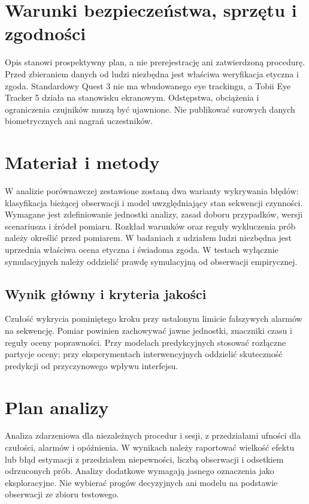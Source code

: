 \documentclass[11pt,a4paper]{article}
\begin{document}
\section{Warunki bezpieczeństwa, sprzętu i zgodności}
Opis stanowi prospektywny plan, a nie prerejestrację ani zatwierdzoną procedurę. Przed zbieraniem danych od ludzi niezbędna jest właściwa weryfikacja etyczna i zgoda. Standardowy Quest 3 nie ma wbudowanego eye trackingu, a Tobii Eye Tracker 5 działa na stanowisku ekranowym. Odstępstwa, obciążenia i ograniczenia czujników muszą być ujawnione. Nie publikować surowych danych biometrycznych ani nagrań uczestników.

\section{Materiał i metody}

W analizie porównawczej zestawione zostaną dwa warianty wykrywania błędów: klasyfikacja bieżącej obserwacji i model uwzględniający stan sekwencji czynności. Wymagane jest zdefiniowanie jednostki analizy, zasad doboru przypadków, wersji scenariusza i źródeł pomiaru. Rozkład warunków oraz reguły wykluczenia prób należy określić przed pomiarem. W badaniach z udziałem ludzi niezbędna jest uprzednia właściwa ocena etyczna i świadoma zgoda. W testach wyłącznie symulacyjnych należy oddzielić prawdę symulacyjną od obserwacji empirycznej.

\subsection{Wynik główny i kryteria jakości}

Czułość wykrycia pominiętego kroku przy ustalonym limicie fałszywych alarmów na sekwencję. Pomiar powinien zachowywać jawne jednostki, znaczniki czasu i reguły oceny poprawności. Przy modelach predykcyjnych stosować rozłączne partycje oceny; przy eksperymentach interwencyjnych oddzielić skuteczność predykcji od przyczynowego wpływu interfejsu.

\section{Plan analizy}

Analiza zdarzeniowa dla niezależnych procedur i sesji, z przedziałami ufności dla czułości, alarmów i opóźnienia. W wynikach należy raportować wielkość efektu lub błąd estymacji z przedziałem niepewności, liczbą obserwacji i odsetkiem odrzuconych prób. Analizy dodatkowe wymagają jasnego oznaczenia jako eksploracyjne. Nie wybierać progów decyzyjnych ani modelu na podstawie obserwacji ze zbioru testowego.
\end{document}
